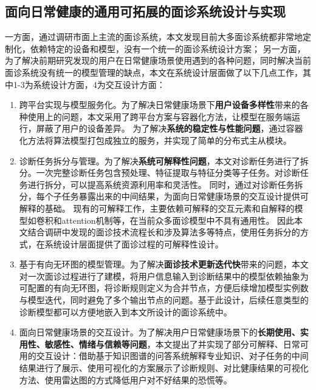 \subsection{面向日常健康的通用可拓展的面诊系统设计与实现}
一方面，通过调研市面上主流的面诊系统，本文发现目前大多面诊系统都非常地定制化，依赖特定的设备和模型，没有一个统一的面诊系统设计方案；
另一方面，为了解决前期研究发现的用户在日常健康场景使用遇到的各种问题，同时解决当前面诊系统没有统一的模型管理的缺点，本文在系统设计层面做了以下几点工作，其中1-3为系统设计方面，4为交互设计方面：
\begin{enumerate}
\item 跨平台实现与模型服务化。为了解决日常健康场景下\textbf{用户设备多样性}带来的各种使用上的问题，本文采用了跨平台方案与容器化方法，让模型在服务端运行，屏蔽了用户的设备差异。
    为了解决\textbf{系统的稳定性与性能问题}，通过容器化方法将算法模型打包成独立的服务，并实现了简单的分布式主从模块。

    \item 诊断任务拆分与管理。为了解决\textbf{系统可解释性问题}，本文对诊断任务进行了拆分。一次完整诊断任务包含预处理、特征提取与特征分类等子任务。对诊断任务进行拆分，可以提高系统资源利用率和灵活性。
    同时，通过对诊断任务拆分，每个子任务暴露出来的中间结果，为面向日常健康场景的交互设计提供可解释的基础。
    现有的可解释工作，主要依赖可解释的交互元素和自解释的模型如卷积和attention机制等\cite{abdul2018trends}，在当前众多面诊模型中不具有通用性。
    因此本文结合调研中发现的面诊技术流程长和涉及算法多等特点，使用任务拆分的方式，在系统设计层面提供了面诊过程的可解释性设计。

    \item 基于有向无环图的模型管理。为了解决\textbf{面诊技术更新迭代快}带来的问题，本文对一次面诊过程进行了建模，将用户信息输入到诊断结果中的模型依赖抽象为可配置的有向无环图，将诊断规则定义为合并节点，方便后续增加模型实例数与模型迭代，同时避免了多个输出节点的问题。基于此设计，后续任意类型的诊断模型都可以方便地嵌入到本文所设计的面诊系统中。
    
    \item 面向日常健康场景的交互设计。为了解决用户日常健康场景下的\textbf{长期使用、实用性、敏感性、情绪与信赖等问题}，本文提出了并实现了部分可解释、日常可用的交互设计：借助基于知识图谱的问答系统解释专业知识、对子任务的中间结果进行了展示、使用可视化的方案展示了诊断规则、对比健康结果的可视化方法、使用雷达图的方式降低用户对不好结果的恐慌等。
\end{enumerate}

